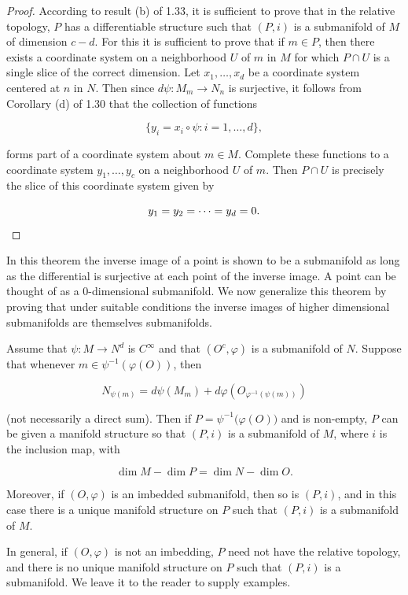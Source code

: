 \begin{proof}
	According to result (b) of 1.33, it is sufficient to prove that in the relative topology, $P$ has a differentiable structure such that $(P,i)$ is a submanifold of $M$ of dimension $c-d$. For this it is sufficient to prove that if $m\in P$, then there exists a coordinate system on a neighborhood $U$ of $m$ in $M$ for which $P\cap U$ is a single slice of the correct dimension. Let $x_{1},\ldots,x_{d}$ be a coordinate system centered at $n$ in $N$. Then since $d\psi:M_{m}\to N_{n}$ is surjective, it follows from Corollary (d) of 1.30 that the collection of functions

	\[
		\{y_{i}=x_{i}\circ\psi\colon i=1,\ldots,d\},
	\]

	forms part of a coordinate system about $m\in M$. Complete these functions to a coordinate system $y_1,\ldots,y_c$ on a neighborhood $U$ of $m$. Then $P\cap U$ is precisely the slice of this coordinate system given by

	\[
		y_{1}=y_{2}=\cdots=y_{d}=0.
		\qedhere
	\]
\end{proof}

In this theorem the inverse image of a point is shown to be a submanifold as long as the differential is surjective at each point of the inverse image. A point can be thought of as a 0-dimensional submanifold. We now generalize this theorem by proving that under suitable conditions the inverse images of higher dimensional submanifolds are themselves submanifolds.

\begin{theorem}\label{thm:1.39}
	Assume that $\psi: M \to N^d$ is $C^\infty$ and that $(O^c, \varphi)$ is a submanifold of $N$. Suppose that whenever $m \in \psi^{-1}\left(\varphi(O)\right)$, then

	\begin{equation}
		\tag{1}\label{eq:1.39:1}
		N_{\psi(m)}=d\psi(M_{m})+d\varphi(O_{\varphi^{-1}(\psi(m))})
	\end{equation}

	(not necessarily a direct sum). Then if $P=\psi^{-1}\big(\varphi(O)\big)$ and is non-empty, $P$ can be given a manifold structure so that $(P,i)$ is a submanifold of $M$, where $i$ is the inclusion map, with

	\begin{equation}
		\tag{2}\label{eq:1.39:2}
		\dim M-\dim P=\dim N-\dim O.
	\end{equation}

	Moreover, if $(O,\varphi)$ is an imbedded submanifold, then so is $(P,i)$, and in this case there is a unique manifold structure on $P$ such that $(P,i)$ is a submanifold of $M$.

	In general, if $(O,\varphi)$ is not an imbedding, $P$ need not have the relative topology, and there is no unique manifold structure on $P$ such that $(P,i)$ is a submanifold. We leave it to the reader to supply examples.

\end{theorem}

